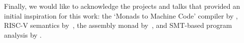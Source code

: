 
Finally, we would like to acknowledge the projects and talks
that provided an initial inspiration for this work: the `Monads to Machine
Code' compiler by \citet{diehl-monads-to-machines}, RISC-V semantics
by~\citet{riscv-semantics}, the assembly monad by~\citet{asm-monad}, and
SMT-based program analysis by \citet{haskell-z3}.
